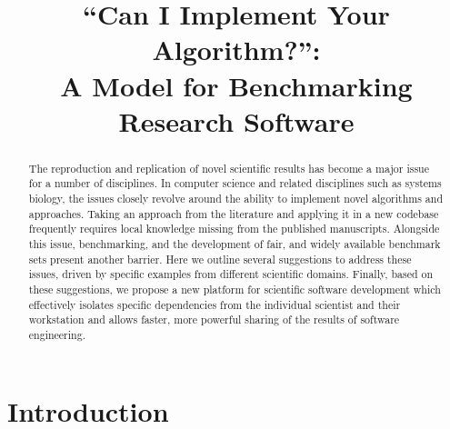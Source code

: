 \documentclass[conference]{IEEEtran}
\begin{document}

\title{``Can I Implement Your Algorithm?'':\\ A Model for Benchmarking Research Software}

\author{
\and
{}
\and
{}
 }

\maketitle

\begin{abstract}
The reproduction and replication of novel scientific results has become
a major issue for a number of disciplines. In computer science and 
related disciplines such as systems biology, the issues closely revolve
around the ability to implement novel algorithms and approaches. Taking
an approach from the literature and applying it in a new codebase frequently
requires local knowledge missing from the published manuscripts. Alongside
this issue, benchmarking, and the development of fair, and widely available
benchmark sets present another barrier. Here we outline several suggestions to
address these issues, driven by specific examples from different scientific domains. 
Finally, based on these suggestions, we propose a new platform for scientific software development which 
effectively isolates specific dependencies from the individual scientist and their
workstation and allows faster, more powerful sharing of the results of software
engineering.
\end{abstract}

\IEEEpeerreviewmaketitle

\section{Introduction}
\end{document}
